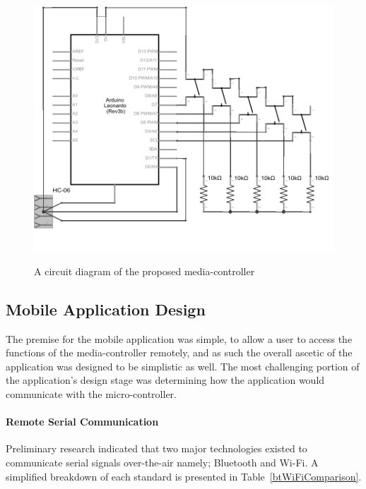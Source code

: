 \documentclass{article}
\begin{document}
			\begin{figure}[]
				\centering
				\label{mediaController_schem}
				{\includegraphics{mediaController_schem}}
				\caption{A circuit diagram of the proposed media-controller}
			\end{figure}
		
		\subsection{Mobile Application Design}
			The premise for the mobile application was simple, to allow a user to access the functions of the media-controller remotely, and as such the overall ascetic of the application was designed to be simplistic as well. The most challenging portion of the application's design stage was determining how the application would communicate with the micro-controller.
			
			\paragraph{Remote Serial Communication}
			Preliminary research indicated that two major technologies existed to communicate serial signals over-the-air namely; Bluetooth and Wi-Fi. A simplified breakdown of each standard is presented in Table~\ref{btWiFiComparison}.
			
\end{document}
